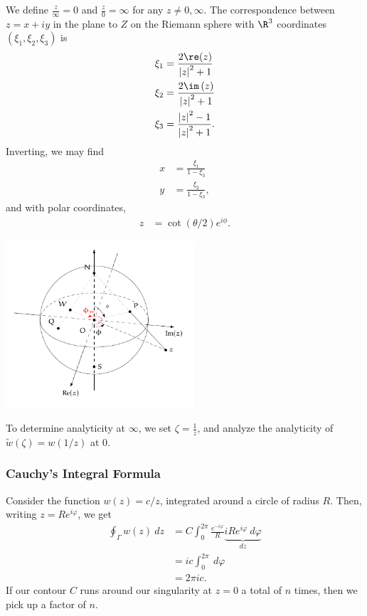 \documentclass[10pt]{mypackage}
\begin{document}
We define $\frac{z}{\infty} = 0$ and $\frac{z}{0} = \infty$ for any $z\neq 0,\infty$. The correspondence between $z = x + iy$ in the plane to $Z$ on the Riemann sphere with $\R^3$ coordinates $\left(\xi_1,\xi_2,\xi_3\right)$ is
\begin{align*}
  \xi_1 &= \frac{2\re(z)}{\left\vert z \right\vert^2 + 1}\\
  \xi_2 &= \frac{2\im\left(z\right)}{\left\vert z \right\vert^2 + 1}\\
  \xi_3 &= \frac{\left\vert z \right\vert^2 - 1}{\left\vert z \right\vert^2 + 1}.
\end{align*}
Inverting, we may find
\begin{align*}
  x &= \frac{\xi_1}{1-\xi_3}\\
  y &= \frac{\xi_2}{1-\xi_3},
\end{align*}
and with polar coordinates,
\begin{align*}
  z &= \cot\left(\theta/2\right)e^{i\phi}.
\end{align*}

\begin{center}
  \includegraphics[width=7cm]{images/riemann_sphere.pdf}
\end{center}
To determine analyticity at $\infty$, we set $\zeta = \frac{1}{z}$, and analyze the analyticity of $\tilde{w}\left(\zeta\right) = w\left(1/z\right)$ at $0$.
\subsubsection{Cauchy's Integral Formula}%
Consider the function $w(z) = c/z$, integrated around a circle of radius $R$. Then, writing $z = Re^{i\varphi}$, we get
\begin{align*}
  \oint_{\Gamma}w(z)\:dz &= C\int_{0}^{2\pi} \frac{e^{-i\varphi}}{R}\underbrace{iRe^{i\varphi}\:d\varphi}_{dz}\\
                         &= ic\int_{0}^{2\pi} \:d\varphi\\
                         &= 2\pi i c.
\end{align*}
If our contour $C$ runs around our singularity at $z = 0$ a total of $n$ times, then we pick up a factor of $n$.\newline
\end{document}
